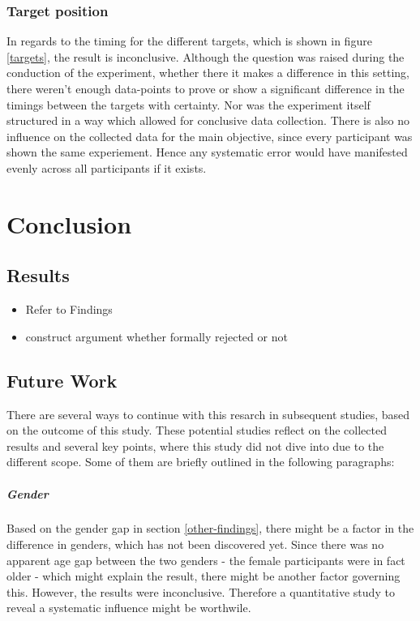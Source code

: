             \subsection{Target position}

                In regards to the timing for the different targets, which is shown in figure \ref*{targets}, the result is inconclusive. Although the question was raised during the conduction of the experiment, whether there it makes a difference in this setting, there weren't enough data-points to prove or show a significant difference in the timings between the targets with certainty. Nor was the experiment itself structured in a way which allowed for conclusive data collection. There is also no influence on the collected data for the main objective, since every participant was shown the same experiement. Hence any systematic error would have manifested evenly across all participants if it exists.

    \chapter{Conclusion}

        \section{Results}

            \begin{itemize}
                \item Refer to Findings
                \item construct argument whether formally rejected or not
            \end{itemize}

        \section{Future Work}

            There are several ways to continue with this resarch in subsequent studies, based on the outcome of this study. These potential studies reflect on the collected results and several key points, where this study did not dive into due to the different scope. Some of them are briefly outlined in the following paragraphs:

            \paragraph{Gender} Based on the gender gap in section \ref*{other-findings}, there might be a factor in the difference in genders, which has not been discovered yet. Since there was no apparent age gap between the two genders - the female participants were in fact older - which might explain the result, there might be another factor governing this. However, the results were inconclusive. Therefore a quantitative study to reveal a systematic influence might be worthwile. 

